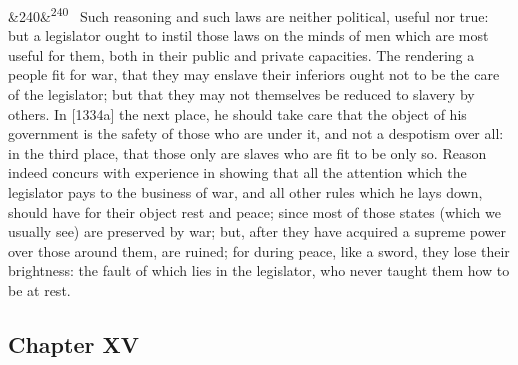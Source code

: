 \documentclass[12pt]{article}
\newcommand{\para}[1][]{\par\noindent\ifx&#1&\else\textsuperscript{\footnotesize #1}~\fi}
\begin{document}
\para[240] Such reasoning and such laws are neither political, useful nor true: but a legislator ought to instil those laws on the minds of men which are most useful for them, both in their public and private capacities. The rendering a people fit for war, that they may enslave their inferiors ought not to be the care of the legislator; but that they may not themselves be reduced to slavery by others. In [1334a] the next place, he should take care that the object of his government is the safety of those who are under it, and not a despotism over all: in the third place, that those only are slaves who are fit to be only so. Reason indeed concurs with experience in showing that all the attention which the legislator pays to the business of war, and all other rules which he lays down, should have for their object rest and peace; since most of those states (which we usually see) are preserved by war; but, after they have acquired a supreme power over those around them, are ruined; for during peace, like a sword, they lose their brightness: the fault of which lies in the legislator, who never taught them how to be at rest.

\subsection*{Chapter XV}
\end{document}
